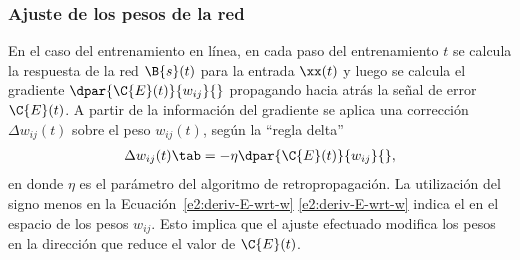 %
\subsubsection{Ajuste de los pesos de la red}
%
En el caso del entrenamiento en línea, en cada paso del entrenamiento
$t$ se calcula la respuesta de la red
$\B{s}(t)$ para la entrada $\xx(t)$ y luego se calcula el gradiente
$\dpar{\C{E}(t)}{w_{ij}}{}$ propagando hacia atrás la señal de error $\C{E}(t)$.
A partir de la información del gradiente
se aplica una corrección $\Delta{}w_{ij}(t)$ sobre el peso
$w_{ij}(t)$, según la ``regla delta''
%
\begin{align}
\label{e2:delta-rule}
  \Delta w_{ij}(t)\tab=-\eta\dpar{\C{E}(t)}{w_{ij}}{},
\end{align}
%
en donde $\eta$ es el parámetro  del
algoritmo de retropropagación. La utilización del signo menos en la
\iflatexml{}Ecuación~\ref{e2:deriv-E-wrt-w}
\else\autoref{e2:deriv-E-wrt-w}\fi{} indica el  en el espacio de los pesos $w_{ij}$. Esto implica que el
ajuste efectuado modifica los pesos en la dirección que reduce el
valor de $\C{E}(t)$.
